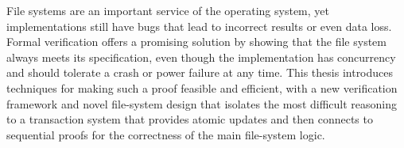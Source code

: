 File systems are an important service of the operating system, yet
implementations still have bugs that lead to incorrect results or even data loss. Formal
verification offers a promising solution by showing that the file system always
meets its specification, even though the implementation has concurrency and
should tolerate a crash or power failure at any time. This thesis introduces
techniques for making such a proof feasible and efficient, with a new
verification framework and novel file-system design that isolates the most
difficult reasoning to a transaction system that provides atomic updates and
then connects to sequential proofs for the correctness of the main file-system
logic.

%
